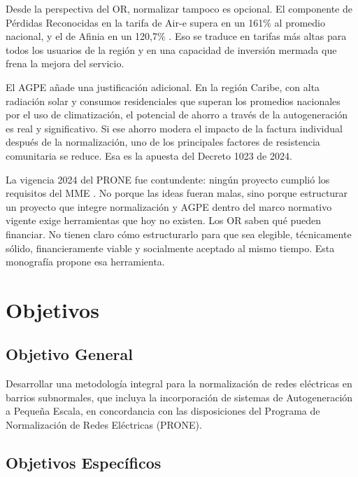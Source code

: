 Desde la perspectiva del OR, normalizar tampoco es opcional. El componente de Pérdidas Reconocidas en la tarifa de Air-e supera en un 161\% al promedio nacional, y el de Afinia en un 120,7\% \parencite{UPME2025}. Eso se traduce en tarifas más altas para todos los usuarios de la región y en una capacidad de inversión mermada que frena la mejora del servicio.

El AGPE añade una justificación adicional. En la región Caribe, con alta radiación solar y consumos residenciales que superan los promedios nacionales por el uso de climatización, el potencial de ahorro a través de la autogeneración es real y significativo. Si ese ahorro modera el impacto de la factura individual después de la normalización, uno de los principales factores de resistencia comunitaria se reduce. Esa es la apuesta del Decreto 1023 de 2024.

La vigencia 2024 del PRONE fue contundente: ningún proyecto cumplió los requisitos del MME \parencite{MME2025}. No porque las ideas fueran malas, sino porque estructurar un proyecto que integre normalización y AGPE dentro del marco normativo vigente exige herramientas que hoy no existen. Los OR saben qué pueden financiar. No tienen claro cómo estructurarlo para que sea elegible, técnicamente sólido, financieramente viable y socialmente aceptado al mismo tiempo. Esta monografía propone esa herramienta.


\section{Objetivos}
\label{sec:objetivos}

\subsection*{Objetivo General}

Desarrollar una metodología integral para la normalización de redes eléctricas en barrios subnormales, que incluya la incorporación de sistemas de Autogeneración a Pequeña Escala, en concordancia con las disposiciones del Programa de Normalización de Redes Eléctricas (PRONE).

\subsection*{Objetivos Específicos}

